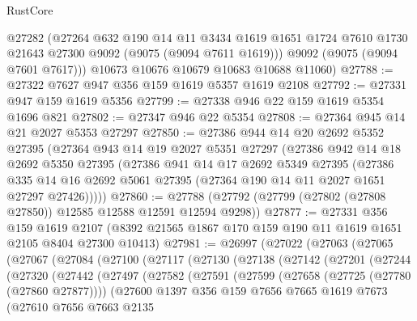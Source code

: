 \begin{lexlean}{RustCore}
\begin{coremodule}
        @27282
        (@27264
          @632
          @190
          @14
          @11
          @3434
          @1619
          @1651
          @1724
          @7610
          @1730
          @21643
          @27300
          @9092
          (@9075 (@9094 @7611 @1619)))
        @9092
        (@9075 (@9094 @7601 @7617)))
      @10673
      @10676
      @10679
      @10683
      @10688
      @11060)
@27788 := @27322 @7627 @947 @356 @159 @1619 @5357 @1619 @2108
@27792 := @27331 @947 @159 @1619 @5356
@27799 := @27338 @946 @22 @159 @1619 @5354 @1696 @821
@27802 := @27347 @946 @22 @5354
@27808 := @27364 @945 @14 @21 @2027 @5353 @27297
@27850 := @27386
    @944
    @14
    @20
    @2692
    @5352
    @27395
    (@27364
      @943
      @14
      @19
      @2027
      @5351
      @27297
      (@27386
        @942
        @14
        @18
        @2692
        @5350
        @27395
        (@27386
          @941
          @14
          @17
          @2692
          @5349
          @27395
          (@27386
            @335
            @14
            @16
            @2692
            @5061
            @27395
            (@27364 @190 @14 @11 @2027 @1651 @27297 @27426)))))
@27860 := @27788 (@27792 (@27799 (@27802 (@27808 @27850)) @12585 @12588 @12591 @12594 @9298))
@27877 := @27331
    @356
    @159
    @1619
    @2107
    (@8392 @21565 @1867 @170 @159 @190 @11 @1619 @1651 @2105 @8404 @27300 @10413)
@27981 := @26997
    (@27022
      (@27063
        (@27065
          (@27067
            (@27084
              (@27100
                (@27117
                  (@27130
                    (@27138
                      (@27142
                        (@27201
                          (@27244
                            (@27320
                              (@27442
                                (@27497
                                  (@27582
                                    (@27591
                                      (@27599
                                        (@27658 (@27725 (@27780 (@27860 @27877))))
                                        (@27600
                                          @1397
                                          @356
                                          @159
                                          @7656
                                          @7665
                                          @1619
                                          @7673
                                          (@27610
                                            @7656
                                            @7663
                                            @2135

\end{coremodule}
\end{lexlean}
